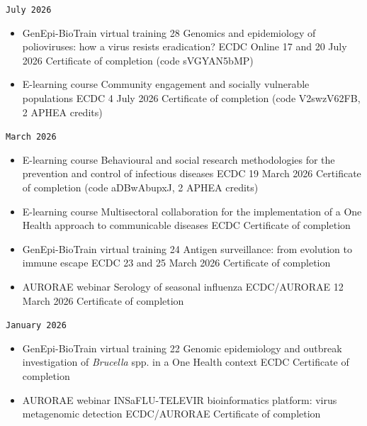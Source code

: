 \documentclass[
  10.5pt,
  a4paper,
  DIV=11,
  numbers=noendperiod]{scrartcl}
\providecommand{\tightlist}{%
  \setlength{\itemsep}{0pt}\setlength{\parskip}{0pt}}
\let\oldtexttt\texttt
\renewcommand{\texttt}[1]{{\color{cvbronze}\small\oldtexttt{#1}}}
\begin{document}
\texttt{July\ 2026}

\begin{itemize}
\tightlist
\item
  GenEpi-BioTrain virtual training 28 \textbar{} Genomics and
  epidemiology of polioviruses: how a virus resists eradication?
  \textbar{} ECDC \textbar{} Online \textbar{} 17 and 20 July 2026
  \textbar{} Certificate of completion (code sVGYAN5bMP)
\item
  E-learning course \textbar{} Community engagement and socially
  vulnerable populations \textbar{} ECDC \textbar{} 4 July 2026
  \textbar{} Certificate of completion (code V2swzV62FB, 2 APHEA
  credits)
\end{itemize}

\texttt{March\ 2026}

\begin{itemize}
\tightlist
\item
  E-learning course \textbar{} Behavioural and social research
  methodologies for the prevention and control of infectious diseases
  \textbar{} ECDC \textbar{} 19 March 2026 \textbar{} Certificate of
  completion (code aDBwAbupxJ, 2 APHEA credits)
\item
  E-learning course \textbar{} Multisectoral collaboration for the
  implementation of a One Health approach to communicable diseases
  \textbar{} ECDC \textbar{} Certificate of completion
\item
  GenEpi-BioTrain virtual training 24 \textbar{} Antigen surveillance:
  from evolution to immune escape \textbar{} ECDC \textbar{} 23 and 25
  March 2026 \textbar{} Certificate of completion
\item
  AURORAE webinar \textbar{} Serology of seasonal influenza \textbar{}
  ECDC/AURORAE \textbar{} 12 March 2026 \textbar{} Certificate of
  completion
\end{itemize}

\texttt{January\ 2026}

\begin{itemize}
\tightlist
\item
  GenEpi-BioTrain virtual training 22 \textbar{} Genomic epidemiology
  and outbreak investigation of \emph{Brucella} spp. in a One Health
  context \textbar{} ECDC \textbar{} Certificate of completion
\item
  AURORAE webinar \textbar{} INSaFLU-TELEVIR bioinformatics platform:
  virus metagenomic detection \textbar{} ECDC/AURORAE \textbar{}
  Certificate of completion
\end{itemize}
\end{document}
